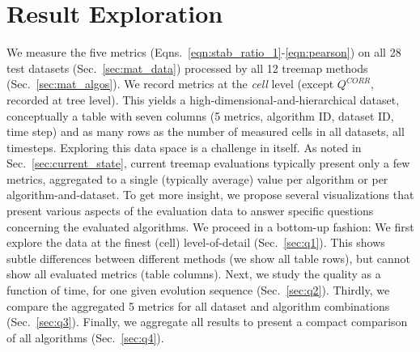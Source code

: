 \section{Result Exploration}
\label{sec:mat_aggr}
%
We measure the five metrics (Eqns.~\ref{eqn:stab_ratio_1}-\ref{eqn:pearson}) on all 28 test datasets (Sec.~\ref{sec:mat_data}) processed by all 12 treemap methods (Sec.~\ref{sec:mat_algos}). We record metrics at the \emph{cell} level (except $Q^{CORR}$, recorded at tree level). This yields a high-dimensional-and-hierarchical dataset, conceptually a
 table with seven columns (5 metrics, algorithm ID, dataset ID, time step) and as many rows as the number of measured cells in all datasets, all timesteps. Exploring this data space is a challenge in itself. As noted in Sec.~\ref{sec:current_state}, current treemap evaluations typically present only a few metrics, aggregated to a single (typically average) value per algorithm or per algorithm-and-dataset. To get more insight, we propose several visualizations that present various aspects of the evaluation data to answer specific questions concerning the evaluated algorithms. We proceed in a bottom-up fashion: We first explore the data at the finest (cell) level-of-detail (Sec.~\ref{sec:q1}). This shows subtle differences between different methods (we show all table rows), but cannot show all evaluated metrics (table columns). Next, we study the quality as a function of time, for one given evolution sequence (Sec.~\ref{sec:q2}). Thirdly, we compare the aggregated 5 metrics for all dataset and algorithm combinations (Sec.~\ref{sec:q3}). Finally, we aggregate all results to present a compact comparison of all algorithms (Sec.~\ref{sec:q4}).

